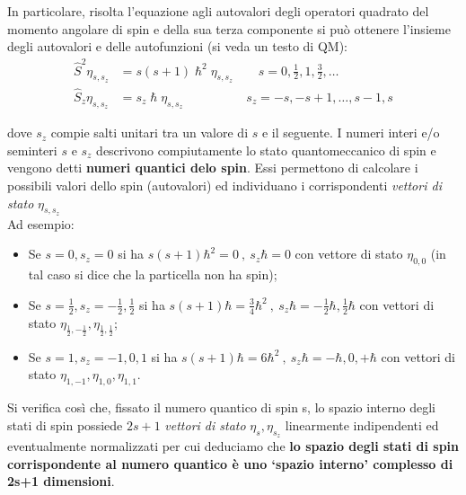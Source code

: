 In particolare, risolta l'equazione agli autovalori degli operatori
quadrato del momento angolare di spin e della sua terza componente si
può ottenere l'insieme degli autovalori e delle autofunzioni (si veda un testo di QM):
\begin{equation}
    \begin{aligned}
        \hat{S}^{2} \eta_{s,s_{z}} &= s (s+1) \hslash^{2} \eta_{s,s_{z}} \qquad s = 0, \frac{1}{2}, 1, \frac{3}{2}, \dots \\
        \hat{S}_{z} \eta_{s,s_{z}} &= s_{z} \hslash \eta_{s,s_{z}} \qquad \qquad \quad s_{z} = -s, -s+1, \dots , s-1, s
    \end{aligned}
    \label{eq:eigenvalue-eq-spin}
\end{equation}

dove \(s_{z}\) compie salti unitari tra un valore di \(s\) e il
seguente.
I numeri interi e/o seminteri $s$ e $s_{z}$ descrivono compiutamente lo stato quantomeccanico di spin e vengono detti \textbf{numeri quantici delo spin}.
Essi permettono di calcolare i possibili valori dello spin (autovalori) ed individuano i corrispondenti \emph{vettori di stato} $\eta_{s,s_{z}}$ \\
Ad esempio:
\begin{itemize}
    \item Se $s = 0,s_{z}=0$ si ha $s(s+1) \hbar^{2} = 0 \ , \ s_{z}\hbar = 0$ con vettore di stato $\eta_{0,0}$ (in tal caso si dice che la particella non ha spin);
    \item Se $s=\frac{1}{2}, s_{z} = -\frac{1}{2}, \frac{1}{2}$ si ha $s(s+1)\hbar = \frac{3}{4} \hbar^{2} \ , \ s_{z}\hbar = -\frac{1}{2}\hbar, \frac{1}{2} \hbar$ con vettori di stato $\eta_{\frac{1}{2} , - \frac{1}{2}} , \eta_{\frac{1}{2}, \frac{1}{2}}$;
    \item Se $s=1 , s_{z} = -1,0,1$ si ha $s(s+1)\hbar = 6\hbar^{2} \ , \ s_{z}\hbar = - \hbar,0, +\hbar$ con vettori di stato $\eta_{1,-1}, \eta_{1,0},\eta_{1,1}$.
\end{itemize}
Si verifica così che, fissato il numero quantico di spin s, lo spazio interno degli stati di spin possiede
$2s+1$ \emph{vettori di stato} $\eta_{s},\eta_{s_{z}}$ linearmente indipendenti ed eventualmente normalizzati per cui deduciamo che \textbf{lo spazio degli stati di spin corrispondente al numero quantico  è uno ‘spazio interno’ complesso di 2s+1 dimensioni}.
\bigskip


